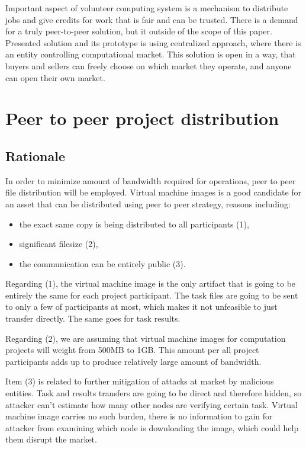 Important aspect of volunteer computing system is a mechanism to distribute jobs and give credits for work that is fair and can be trusted. There is a demand for a truly peer-to-peer solution, but it outside of the scope of this paper. Presented solution and its prototype is using centralized approach, where there is an entity controlling computational market. This solution is open in a way, that buyers and sellers can freely choose on which market they operate, and anyone can open their own market.

\begin{comment}
In similar way the bitcoin pooled mining works. Bitcoin miners connect into centralized pool and share their rewards. The pool itself is centralized, but everyone is free to choose their pool, or even open one themselves.
\end{comment}

\section{Peer to peer project distribution}
\label{sec:p2p_projects}

\subsection{Rationale}

In order to minimize amount of bandwidth required for operations, peer to peer file distribution will be employed. Virtual machine images is a good candidate for an asset that can be distributed using peer to peer strategy, reasons including:
\begin{itemize}
	\item the exact same copy is being distributed to all participants (1),
	\item significant filesize (2),
	\item the communication can be entirely public (3).
\end{itemize}

Regarding (1), the virtual machine image is the only artifact that is going to be entirely the same for each project participant. The task files are going to be sent to only a few of participants at most, which makes it not unfeasible to just transfer directly. The same goes for task results.

Regarding (2), we are assuming that virtual machine images for computation projects will weight from 500MB to 1GB. This amount per all project participants adds up to produce relatively large amount of bandwidth.

Item (3) is related to further mitigation of attacks at market by malicious entities. Task and results transfers are going to be direct and therefore hidden, so attacker can't estimate how many other nodes are verifying certain task. Virtual machine image carries no such burden, there is no information to gain for attacker from examining which node is downloading the image, which could help them disrupt the market.